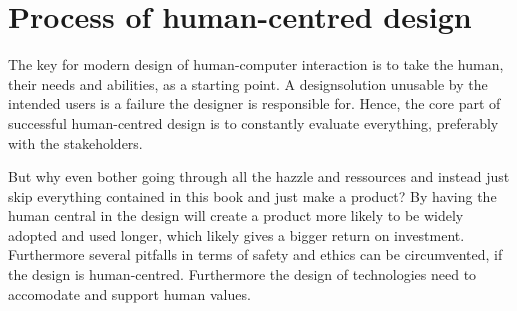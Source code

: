 \chapter{Process of human-centred design} \label{chap:process}
The key for modern design of human-computer interaction is to take the human, their needs and abilities, as a starting point. A designsolution unusable by the intended users is a failure the designer is responsible for. Hence, the core part of successful human-centred design is to constantly evaluate everything, preferably with the stakeholders.

But why even bother going through all the hazzle and ressources and instead just skip everything contained in this book and just make a product? By having the human central in the design will create a product more likely to be widely adopted and used longer, which likely gives a bigger return on investment. Furthermore several pitfalls in terms of safety and ethics can be circumvented, if the design is human-centred. Furthermore the design of technologies need to accomodate and support human values. \cite[p. 20-22]{benyon14}

\vfill \minitoc \newpage




